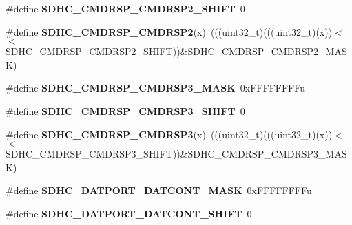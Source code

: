 \begin{DoxyCompactItemize}
\item 
\#define {\bfseries S\+D\+H\+C\+\_\+\+C\+M\+D\+R\+S\+P\+\_\+\+C\+M\+D\+R\+S\+P2\+\_\+\+S\+H\+I\+FT}~0\hypertarget{group__SDHC__Register__Masks_ga68102815f97db907271c9feb9b35d48f}{}\label{group__SDHC__Register__Masks_ga68102815f97db907271c9feb9b35d48f}

\item 
\#define {\bfseries S\+D\+H\+C\+\_\+\+C\+M\+D\+R\+S\+P\+\_\+\+C\+M\+D\+R\+S\+P2}(x)~(((uint32\+\_\+t)(((uint32\+\_\+t)(x))$<$$<$S\+D\+H\+C\+\_\+\+C\+M\+D\+R\+S\+P\+\_\+\+C\+M\+D\+R\+S\+P2\+\_\+\+S\+H\+I\+FT))\&S\+D\+H\+C\+\_\+\+C\+M\+D\+R\+S\+P\+\_\+\+C\+M\+D\+R\+S\+P2\+\_\+\+M\+A\+SK)\hypertarget{group__SDHC__Register__Masks_ga6cd881a6a37704b8eb197856111608b6}{}\label{group__SDHC__Register__Masks_ga6cd881a6a37704b8eb197856111608b6}

\item 
\#define {\bfseries S\+D\+H\+C\+\_\+\+C\+M\+D\+R\+S\+P\+\_\+\+C\+M\+D\+R\+S\+P3\+\_\+\+M\+A\+SK}~0x\+F\+F\+F\+F\+F\+F\+F\+Fu\hypertarget{group__SDHC__Register__Masks_ga455887881ffdaa8edd983e6e68ffe4d2}{}\label{group__SDHC__Register__Masks_ga455887881ffdaa8edd983e6e68ffe4d2}

\item 
\#define {\bfseries S\+D\+H\+C\+\_\+\+C\+M\+D\+R\+S\+P\+\_\+\+C\+M\+D\+R\+S\+P3\+\_\+\+S\+H\+I\+FT}~0\hypertarget{group__SDHC__Register__Masks_ga5b08d155eccc29ab8f8ff62bc10a23a1}{}\label{group__SDHC__Register__Masks_ga5b08d155eccc29ab8f8ff62bc10a23a1}

\item 
\#define {\bfseries S\+D\+H\+C\+\_\+\+C\+M\+D\+R\+S\+P\+\_\+\+C\+M\+D\+R\+S\+P3}(x)~(((uint32\+\_\+t)(((uint32\+\_\+t)(x))$<$$<$S\+D\+H\+C\+\_\+\+C\+M\+D\+R\+S\+P\+\_\+\+C\+M\+D\+R\+S\+P3\+\_\+\+S\+H\+I\+FT))\&S\+D\+H\+C\+\_\+\+C\+M\+D\+R\+S\+P\+\_\+\+C\+M\+D\+R\+S\+P3\+\_\+\+M\+A\+SK)\hypertarget{group__SDHC__Register__Masks_ga025b72392ed5a288a1cd4482e6d66c8d}{}\label{group__SDHC__Register__Masks_ga025b72392ed5a288a1cd4482e6d66c8d}

\item 
\#define {\bfseries S\+D\+H\+C\+\_\+\+D\+A\+T\+P\+O\+R\+T\+\_\+\+D\+A\+T\+C\+O\+N\+T\+\_\+\+M\+A\+SK}~0x\+F\+F\+F\+F\+F\+F\+F\+Fu\hypertarget{group__SDHC__Register__Masks_gad3095c85c287cb31fd4cd815f8516213}{}\label{group__SDHC__Register__Masks_gad3095c85c287cb31fd4cd815f8516213}

\item 
\#define {\bfseries S\+D\+H\+C\+\_\+\+D\+A\+T\+P\+O\+R\+T\+\_\+\+D\+A\+T\+C\+O\+N\+T\+\_\+\+S\+H\+I\+FT}~0\hypertarget{group__SDHC__Register__Masks_ga8d1d79a58015eaa7fe8f8dc6f3655781}{}\label{group__SDHC__Register__Masks_ga8d1d79a58015eaa7fe8f8dc6f3655781}


\end{DoxyCompactItemize}
